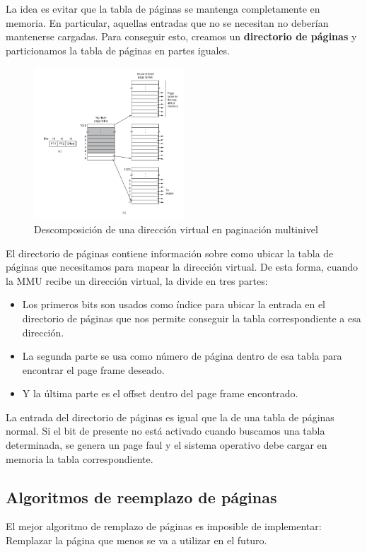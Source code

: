 La idea es evitar que la tabla de páginas se mantenga completamente en memoria. En particular, aquellas entradas que no se necesitan no deberían mantenerse cargadas. Para conseguir esto, creamos un \textbf{directorio de páginas} y particionamos la tabla de páginas en partes iguales.

\begin{figure}[h]
	\centering
	\includegraphics[width=0.5\textwidth]{imagenes/multilevel-page-table}
	\caption{Descomposición de una dirección virtual en paginación multinivel}
	\label{fig:multilevel-page-table}
\end{figure}

El directorio de páginas contiene información sobre como ubicar la tabla de páginas que necesitamos para mapear la dirección virtual. De esta forma, cuando la MMU recibe un dirección virtual, la divide en tres partes:

\begin{itemize}
	\item Los primeros bits son usados como índice para ubicar la entrada en el directorio de páginas que nos permite conseguir la tabla correspondiente a esa dirección.
	\item La segunda parte se usa como número de página dentro de esa tabla para encontrar el page frame deseado.
	\item Y la última parte es el offset dentro del page frame encontrado.
\end{itemize}

La entrada del directorio de páginas es igual que la de una tabla de páginas normal. Si el bit de presente no está activado cuando buscamos una tabla determinada, se genera un page faul y el sistema operativo debe cargar en memoria la tabla correspondiente.

\subsection{Algoritmos de reemplazo de páginas}
El mejor algoritmo de remplazo de páginas es imposible de implementar: Remplazar la página que menos se va a utilizar en el futuro.

